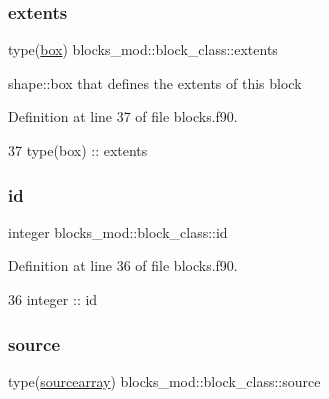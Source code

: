 \subsubsection{\texorpdfstring{extents}{extents}}
{\footnotesize\ttfamily type(\mbox{\hyperlink{structgeometry__mod_1_1box}{box}}) blocks\+\_\+mod\+::block\+\_\+class\+::extents\hspace{0.3cm}{\ttfamily [private]}}



shape\+::box that defines the extents of this block 



Definition at line 37 of file blocks.\+f90.


\begin{DoxyCode}
37         \textcolor{keywordtype}{type}(box) :: extents
\end{DoxyCode}
\mbox{\label{structblocks__mod_1_1block__class_addd1a493d56aa1ffd1bc27c56b682065}} 
\subsubsection{\texorpdfstring{id}{id}}
{\footnotesize\ttfamily integer blocks\+\_\+mod\+::block\+\_\+class\+::id\hspace{0.3cm}{\ttfamily [private]}}



Definition at line 36 of file blocks.\+f90.


\begin{DoxyCode}
36         \textcolor{keywordtype}{integer} :: id
\end{DoxyCode}
\mbox{\label{structblocks__mod_1_1block__class_a398a25c84b76ebe336c1384552bda602}} 
\subsubsection{\texorpdfstring{source}{source}}
{\footnotesize\ttfamily type(\mbox{\hyperlink{structsources__array__mod_1_1sourcearray}{sourcearray}}) blocks\+\_\+mod\+::block\+\_\+class\+::source\hspace{0.3cm}{\ttfamily [private]}}



